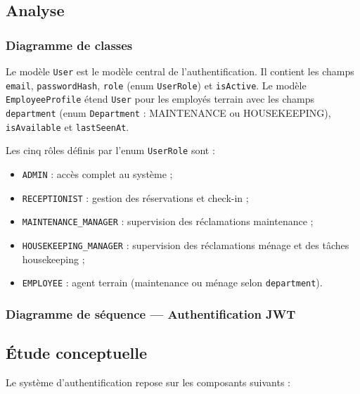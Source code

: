 \subsection{Analyse}

\subsubsection{Diagramme de classes}


Le modèle \texttt{User} est le modèle central de l'authentification. Il contient les champs \texttt{email}, \texttt{passwordHash}, \texttt{role} (enum \texttt{UserRole}) et \texttt{isActive}. Le modèle \texttt{EmployeeProfile} étend \texttt{User} pour les employés terrain avec les champs \texttt{department} (enum \texttt{Department} : MAINTENANCE ou HOUSEKEEPING), \texttt{isAvailable} et \texttt{lastSeenAt}.

Les cinq rôles définis par l'enum \texttt{UserRole} sont :
\begin{itemize}
  \item \texttt{ADMIN} : accès complet au système ;
  \item \texttt{RECEPTIONIST} : gestion des réservations et check-in ;
  \item \texttt{MAINTENANCE\_MANAGER} : supervision des réclamations maintenance ;
  \item \texttt{HOUSEKEEPING\_MANAGER} : supervision des réclamations ménage et des tâches housekeeping ;
  \item \texttt{EMPLOYEE} : agent terrain (maintenance ou ménage selon \texttt{department}).
\end{itemize}

\subsubsection{Diagramme de séquence — Authentification JWT}


\subsection{Étude conceptuelle}

Le système d'authentification repose sur les composants suivants :

